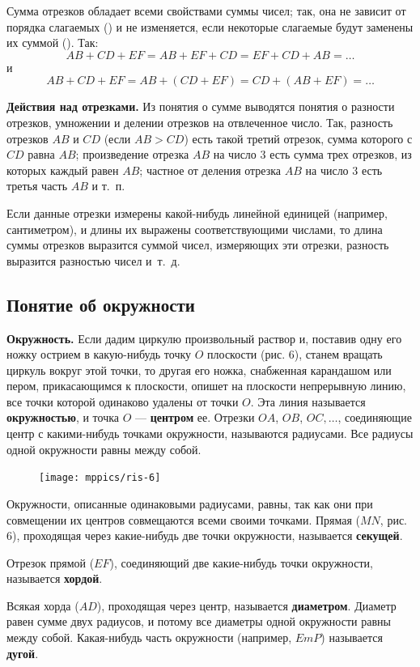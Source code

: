 \documentclass[oneside]{book}
\begin{document}
Сумма отрезков обладает всеми свойствами суммы чисел;
так, она не зависит от порядка слагаемых () и не изменяется, если некоторые слагаемые будут заменены их суммой ().
Так:
\[AB+CD+EF=AB+EF+CD=EF+CD+AB=\dots\]
и
\[AB+CD+EF=AB+(CD+EF)=CD+(AB+EF)=\dots\]

\textbf{Действия над отрезками.}
Из понятия о сумме выводятся понятия о разности отрезков, умножении и делении отрезков на отвлеченное число.
Так, разность отрезков $AB$ и $CD$ (если $AB>CD$) есть такой третий отрезок, сумма которого с $CD$ равна $AB$;
произведение отрезка $AB$ на число 3 есть сумма трех отрезков, из которых каждый равен $AB$;
частное от деления отрезка $AB$ на число 3 есть третья часть $AB$ и т.~п.

Если данные отрезки измерены какой-нибудь линейной единицей (например, сантиметром), и длины их выражены соответствующими числами, то длина суммы отрезков выразится суммой чисел, измеряющих эти отрезки, разность выразится разностью чисел и~т.~д.

\subsection*{Понятие об окружности}

\textbf{Окружность.}
Если дадим циркулю произвольный раствор и, поставив одну его ножку острием в какую-нибудь точку $O$ плоскости (рис. 6), станем вращать циркуль вокруг этой точки, то другая его ножка, снабженная карандашом или пером, прикасающимся к плоскости, опишет на плоскости непрерывную линию, все точки которой одинаково удалены от точки $O$.
Эта линия называется \textbf{окружностью}, и точка $O$ — \textbf{центром} ее.
Отрезки $OA$, $OB$, $OC,\dots$, соединяющие центр с какими-нибудь точками окружности, называются радиусами.
Все радиусы одной окружности равны между собой.

\begin{figure}
\texttt{[image: mppics/ris-6]}
\caption{}
\end{figure}

Окружности, описанные одинаковыми радиусами, равны, так как они при совмещении их центров совмещаются всеми своими точками.
Прямая ($MN$, рис. 6), проходящая через какие-нибудь две точки окружности, называется \textbf{секущей}.

Отрезок прямой ($EF$), соединяющий две какие-нибудь точки окружности, называется \textbf{хордой}.

Всякая хорда ($AD$), проходящая через центр, называется \textbf{диаметром}.
Диаметр равен сумме двух радиусов, и потому все диаметры одной окружности равны между собой.
Какая-нибудь часть окружности (например, $EmP$) называется \textbf{дугой}.
\end{document}
